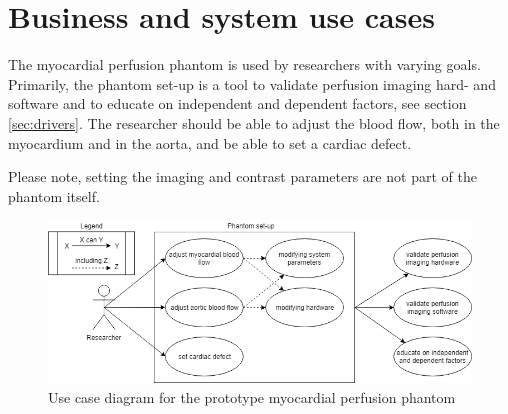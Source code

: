 \section{Business and system use cases}	
The myocardial perfusion phantom is used by researchers with varying goals. Primarily, the phantom set-up is a tool to validate perfusion imaging hard- and software and to educate on independent and dependent factors, see section \ref{sec:drivers}. The researcher should be able to adjust the blood flow, both in the myocardium and in the aorta, and be able to set a cardiac defect.

Please note, setting the imaging and contrast parameters are not part of the phantom itself. 
\begin{figure}[!h]
	\includegraphics[width=\textwidth]{./images/usecase_diagram.png}
	\caption{Use case diagram for the prototype myocardial perfusion phantom}
	\label{fig:usecase}
\end{figure}

